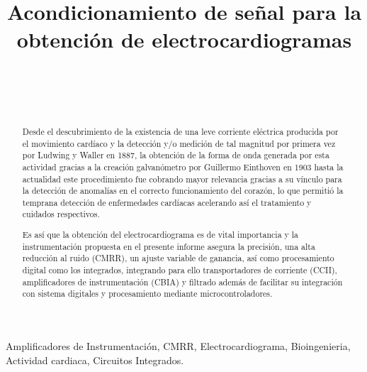\documentclass[conference]{IEEEtran}
\begin{document}
	
	\title{Acondicionamiento de señal para la obtención de electrocardiogramas}
	\author{
		\\
		\\
		\\
		\and
		\and
	}
	
	\maketitle
	\begin{abstract}
		
	Desde el descubrimiento de la existencia de una leve corriente eléctrica producida por el movimiento cardíaco y la detección y/o medición de tal magnitud por primera vez por Ludwing y Waller en 1887, la obtención de la forma de onda generada por esta actividad gracias a la creación galvanómetro por Guillermo Einthoven en 1903 hasta la actualidad este procedimiento fue cobrando mayor relevancia gracias a su vínculo para la detección de anomalías en el correcto funcionamiento del corazón, lo que permitió la temprana detección de enfermedades cardíacas acelerando así el tratamiento y cuidados respectivos.
	
	Es así que la obtención del electrocardiograma es de vital importancia y la instrumentación propuesta en el presente  informe asegura la precisión, una alta reducción al ruido (CMRR), un ajuste variable de ganancia, así como procesamiento digital como los integrados, integrando para ello transportadores de corriente (CCII), amplificadores de instrumentación (CBIA) y filtrado además de facilitar su integración con sistema digitales y procesamiento mediante microcontroladores.
	
	\end{abstract}
	
	\begin{IEEEkeywords}
		Amplificadores de Instrumentación, CMRR, Electrocardiograma, Bioingenieria, Actividad cardiaca, Circuitos Integrados.
	\end{IEEEkeywords}
	
\end{document}
